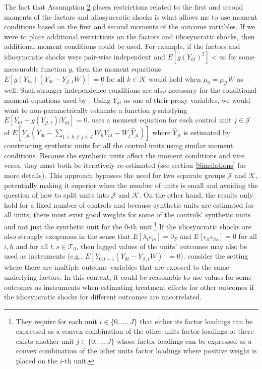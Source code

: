 \documentclass{article}
\begin{document}
\par
The fact that Assumption \hyperref[A2]{2} places restrictions related to the first and second moments of the factors and idiosyncratic shocks is what allows me to use moment conditions based on the first and second moments of the outcome variables. If we were to place additional restrictions on the factors and idiosyncratic shocks, then additional moment conditions could be used. For example, if the factors and idiosyncratic shocks were pair-wise independent and $E[g(Y_{kt})^2] < \infty$ for some measurable function $g$, then the moment equations $E[g(Y_{kt})(Y_{0t} - Y_{\mathcal{J},t}W)] = 0 \; \text{for all } k \in \mathcal{K}$ would hold when $\mu_0 = \mu_{\mathcal{J}}W$ as well. Such stronger independence conditions are also necessary for the conditional moment equations used by \cite{shi2023}. Using $Y_{kt}$ as one of their proxy variables, we would want to non-parametrically estimate a function $g$ satisfying $E[Y_{0t} - g(Y_{\mathcal{J},t})|Y_{kt}] = 0$. \cite{Powell2021} uses a moment equation for each control unit $j \in \mathcal{J}$ of $E[Y_{jt}(Y_{0t} - \sum_{1\leq h \ne j \leq J} W_h Y_{ht} - W_j \hat{Y}_{jt})]$ where $\hat{Y}_{jt}$ is estimated by constructing synthetic units for all the control units using similar moment conditions. Because the synthetic units affect the moment conditions and vice versa, they must both be iteratively re-estimated (see section \ref{Simulations} for more details). This approach bypasses the need for two separate groups $\mathcal{J}$ and $\mathcal{K}$, potentially making it superior when the number of units is small and avoiding the question of how to split units into $\mathcal{J}$ and $\mathcal{K}$. On the other hand, the results only hold for a fixed number of controls and because synthetic units are estimated for all units, there must exist good weights for some of the controls' synthetic units and not just the synthetic unit for the $0$-th unit.\footnote{They require for each unit $i \in \{0,...,J\}$ that either its factor loadings can be expressed as a convex combination of the other units factor loadings or there exists another unit $j \in \{0,...,J\}$ whose factor loadings can be expressed as a convex combination of the other units factor loadings where positive weight is placed on the $i$-th unit.} If the idiosyncratic shocks are also strongly exogenous in the sense that $E[\lambda_t \epsilon_{is}] = 0_F$ and $E[\epsilon_{it}\epsilon_{hs}] = 0$ for all $i,h$ and for all $t, s \in \mathcal{T}_0$, then lagged values of the units' outcomes may also be used as instruments (e.g., $E[Y_{0,t-1}(Y_{0t} - Y_{\mathcal{J},t}W)] = 0$). \cite{sunBen-MichaelFeller2023} consider the setting where there are multiple outcome variables that are exposed to the same underlying factors. In this context, it could be reasonable to use values for some outcomes as instruments when estimating treatment effects for other outcomes if the idiosyncratic shocks for different outcomes are uncorrelated.
\end{document}
